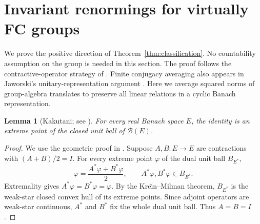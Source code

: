 \documentclass[11pt,letterpaper]{amsart}
\newtheorem{lemma}[theorem]{Lemma}
\theoremstyle{definition}
\theoremstyle{remark}
\begin{document}
\section{Invariant renormings for virtually FC groups}\label{sec:positive}
We prove the positive direction of Theorem~\ref{thm:classification}.
No countability assumption on the group is needed in this section.
The proof follows the contractive-operator strategy of
\cite[Theorem~5.3]{DD}. Finite conjugacy averaging also appears in
Jaworski's unitary-representation argument \cite[proof of Theorem~4.4]{J}.
Here we average squared norms of group-algebra translates to preserve
all linear relations in a cyclic Banach representation.

\begin{lemma}[{Kakutani; see \cite[Theorem~8.28]{EFHN}}]\label{lem:identity}
For every real Banach space $E$, the identity is an extreme point of
the closed unit ball of $\mathcal B(E)$.
\end{lemma}
\begin{proof}
We use the geometric proof in \cite[Theorem~8.28]{EFHN}.
Suppose $A,B:E\to E$ are contractions with $(A+B)/2=I$.
For every extreme point $\varphi$ of the dual unit ball $B_{E^*}$,
\[
 \varphi=\frac{A^*\varphi+B^*\varphi}{2},\qquad
 A^*\varphi,B^*\varphi\in B_{E^*}.
\]
Extremality gives $A^*\varphi=B^*\varphi=\varphi$.
By the Kre\u{\i}n--Milman theorem, $B_{E^*}$ is the weak-star closed
convex hull of its extreme points. Since adjoint operators are
weak-star continuous, $A^*$ and $B^*$ fix the whole dual unit ball.
Thus $A=B=I$.
\end{proof}
\end{document}
